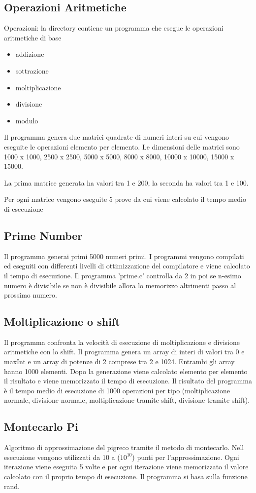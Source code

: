 \documentclass[12pt,a4paper]{report}
\begin{document}
\subsection{Operazioni Aritmetiche}
Operazioni: la directory contiene un programma che esegue le operazioni aritmetiche di base 
\begin{itemize}
	\item addizione
	\item sottrazione
	\item moltiplicazione
	\item divisione
	\item modulo
\end{itemize} 
Il programma genera due matrici quadrate di numeri interi su cui vengono eseguite le operazioni elemento per elemento. Le dimensioni delle matrici sono 1000 x 1000, 2500 x 2500, 5000 x 5000, 8000 x 8000, 10000 x 10000, 15000 x 15000.

La prima matrice generata ha valori tra 1 e 200, la seconda ha valori tra 1 e 100.

Per ogni matrice vengono eseguite 5 prove da cui viene calcolato il tempo medio di esecuzione

\subsection{Prime Number}
Il programma generai primi 5000 numeri primi. I programmi vengono compilati ed eseguiti con differenti livelli di ottimizzazione del compilatore e viene calcolato il tempo di esecuzione. 
Il programma 'prime.c' controlla da 2 in poi se n-esimo numero è divisibile se non è divisibile allora lo memorizzo altrimenti passo al prossimo numero.  

\subsection{Moltiplicazione o shift}
Il programma confronta la velocità di esecuzione di moltiplicazione e divisione aritmetiche con lo shift. Il programma genera un array di interi di valori tra 0 e maxInt e un array di potenze di 2 comprese tra 2 e 1024. Entrambi gli array hanno 1000 elementi. Dopo la generazione viene calcolato elemento per elemento il risultato e viene memorizzato il tempo di esecuzione. Il risultato del programma è il tempo medio di esecuzione di 1000 operazioni per tipo (moltiplicazione normale, divisione normale, moltiplicazione tramite shift, divisione tramite shift).

\subsection{Montecarlo Pi}
Algoritmo di approssimazione del pigreco tramite il metodo di montecarlo. Nell esecuzione vengono utilizzati da 10 a ($ 10^{10} $) punti per l'approssimazione. Ogni iterazione viene eseguita 5 volte e per ogni iterazione viene memorizzato il valore calcolato con il proprio tempo di esecuzione. Il programma si basa sulla funzione rand.
\end{document}
